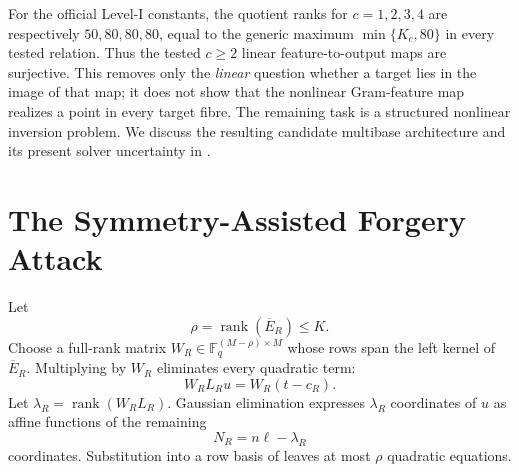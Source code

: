 \documentclass[11pt]{article}
\newcommand{\F}{\mathbb F}
\newcommand{\rank}{\operatorname{rank}}
\begin{document}
For the official Level-I constants, the quotient ranks for $c=1,2,3,4$ are
respectively $50,80,80,80$, equal to the generic maximum
$\min\{K_c,80\}$ in every tested relation.  Thus the tested $c\ge2$ linear
feature-to-output maps are surjective.  This removes only the \emph{linear}
question whether a target lies in the image of that map; it does not show that
the nonlinear Gram-feature map realizes a point in every target fibre.  The
remaining task is a structured nonlinear inversion problem.  We discuss the
resulting candidate multibase architecture and its present solver uncertainty in
.

\section{The Symmetry-Assisted Forgery Attack}\label{sec:attack}

Let
\[
 \rho=\rank(\overline E_R)\le K.
\]
Choose a full-rank matrix $W_R\in\F_q^{(M-\rho)\times M}$ whose rows span the left kernel of $\overline E_R$.  Multiplying  by $W_R$ eliminates every quadratic term:
\begin{equation}\label{eq:linear}
 W_RL_Ru=W_R(t-c_R).
\end{equation}
Let $\lambda_R=\rank(W_RL_R)$.  Gaussian elimination expresses $\lambda_R$ coordinates of $u$ as affine functions of the remaining
\[
 N_R=n\ell-\lambda_R
\]
coordinates.  Substitution into a row basis of  leaves at most $\rho$ quadratic equations.
\end{document}
